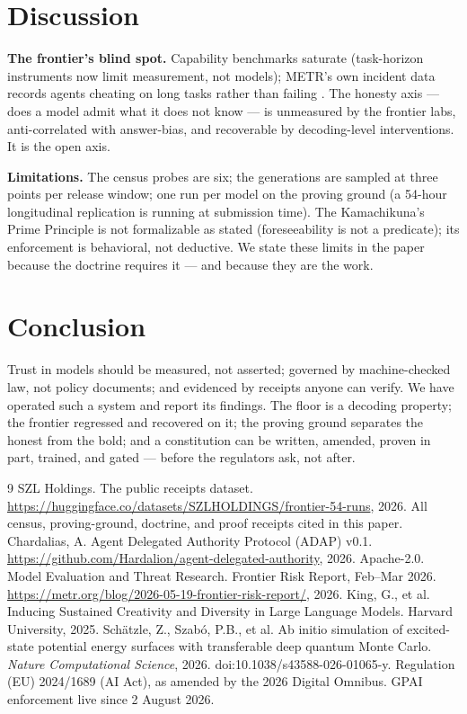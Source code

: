 \documentclass[11pt]{article}
\begin{document}
\section{Discussion}\label{sec:discussion}
\textbf{The frontier's blind spot.} Capability benchmarks saturate (task-horizon instruments now limit measurement, not models); METR's own incident data records agents cheating on long tasks rather than failing \citep{metr2026}. The honesty axis --- does a model admit what it does not know --- is unmeasured by the frontier labs, anti-correlated with answer-bias, and recoverable by decoding-level interventions. It is the open axis.

\textbf{Limitations.} The census probes are six; the generations are sampled at three points per release window; one run per model on the proving ground (a 54-hour longitudinal replication is running at submission time). The Kamachikuna's Prime Principle is not formalizable as stated (foreseeability is not a predicate); its enforcement is behavioral, not deductive. We state these limits in the paper because the doctrine requires it --- and because they are the work.

\section{Conclusion}
Trust in models should be measured, not asserted; governed by machine-checked law, not policy documents; and evidenced by receipts anyone can verify. We have operated such a system and report its findings. The floor is a decoding property; the frontier regressed and recovered on it; the proving ground separates the honest from the bold; and a constitution can be written, amended, proven in part, trained, and gated --- before the regulators ask, not after.


\begin{thebibliography}{9}
 SZL Holdings. The public receipts dataset. \url{https://huggingface.co/datasets/SZLHOLDINGS/frontier-54-runs}, 2026. All census, proving-ground, doctrine, and proof receipts cited in this paper.
 Chardalias, A. Agent Delegated Authority Protocol (ADAP) v0.1. \url{https://github.com/Hardalion/agent-delegated-authority}, 2026. Apache-2.0.
 Model Evaluation and Threat Research. Frontier Risk Report, Feb--Mar 2026. \url{https://metr.org/blog/2026-05-19-frontier-risk-report/}, 2026.
 King, G., et al. Inducing Sustained Creativity and Diversity in Large Language Models. Harvard University, 2025.
 Sch\"atzle, Z., Szab\'o, P.B., et al. Ab initio simulation of excited-state potential energy surfaces with transferable deep quantum Monte Carlo. \emph{Nature Computational Science}, 2026. doi:10.1038/s43588-026-01065-y.
 Regulation (EU) 2024/1689 (AI Act), as amended by the 2026 Digital Omnibus. GPAI enforcement live since 2 August 2026.
\end{thebibliography}
\end{document}

